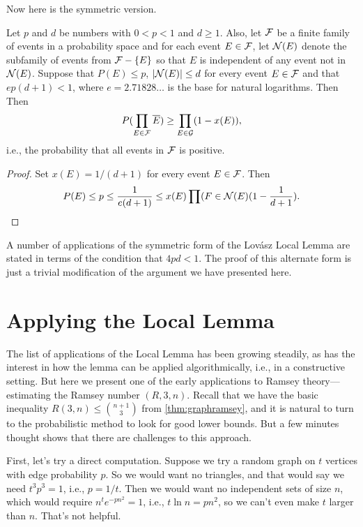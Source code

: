Now here is the symmetric version.

\begin{lemma}\label{lem:LLL-sym}
Let $p$ and $d$ be numbers with $0<p<1$ and $d\ge 1$.  Also,
let $\mathcal{F}$ be a finite family of events in a probability space 
and for each event $E\in\mathcal{F}$, let $\mathcal{N}(E)$ denote the 
subfamily of events from $\mathcal{F}-\{E\}$ so that $E$ is independent of 
any event not in $\mathcal{N}(E)$.  Suppose that $P(E)\le p$, $|\mathcal{N}(E)|\le d$ for 
every event $E\in\mathcal{F}$ and that $ep(d+1)<1$, where 
$e=2.71828\dots$ is the base for natural logarithms.  Then
Then
\[
P(\prod_{E\in\mathcal{F}}\overline{E})\ge\prod_{E\in\mathcal{G}}(1-x(E)),
\]
i.e., the probability that all events in $\mathcal{F}$ is positive.
\end{lemma}
\begin{proof}
Set $x(E)=1/(d+1)$ for every event $E\in\mathcal{F}$.  Then
\[
P(E)\le p\le \frac{1}{e(d+1)}\le x(E)\prod(F\in\mathcal{N}(E)(1-\frac{1}{d+1}).
\]
\end{proof}

A number of applications of the symmetric form of the Lov\'asz Local
Lemma are stated in terms of the condition that $4pd<1$.  The proof
of this alternate form is just a trivial modification of the argument
we have presented here.

\section{Applying the Local Lemma}\label{s:kitchensink:applying-local-lemma}

The list of applications of the Local Lemma has been growing
steadily, as has the interest in how the lemma can be applied
algorithmically, i.e., in a constructive setting.  But here
we present one of the early applications to Ramsey theory---estimating
the Ramsey number $(R,3,n)$.  Recall that we have the basic inequality 
$R(3,n)\le \binom{n+1}{3}$ from \autoref{thm:graphramsey}, and it is
natural to turn to the probabilistic method to look for good lower bounds.
But a few minutes thought shows that there are challenges to this
approach.

First, let's try a direct computation.  Suppose we try a random graph
on $t$ vertices with edge probability $p$.  So we would want no triangles,
and that would say we need $t^3p^3=1$, i.e., $p=1/t$.  Then we
would want no independent sets of size $n$, which would require
$n^te^{-pn^2}=1$, i.e., $t\ln n=pn^2$, so we can't even make
$t$ larger than $n$.  That's not helpful.

